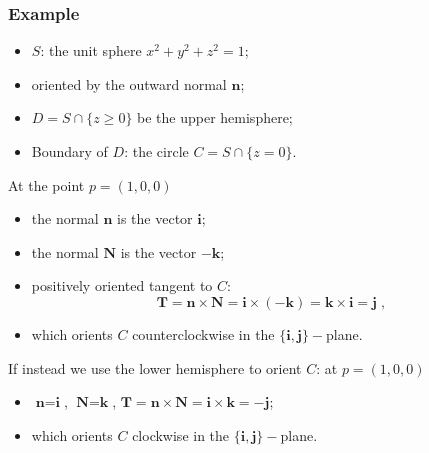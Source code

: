 \begin{frame}
  \frametitle{Example}

\begin{itemize}
  \item $S$: the unit sphere $x^2+y^2+z^2 = 1$;
  \item oriented by the outward normal $\textbf{n}$;
  \item $D = S \cap \{z\geqslant 0\}$ be the upper hemisphere;
  \item Boundary of $D$: the circle $C= S \cap \{z=0\}$.
\end{itemize}

\pause At the point $p=(1,0,0)$
\begin{itemize}
  \item the normal $\textbf{n}$ is the vector \pause $\textbf{i}$;
  \item the normal $\textbf{N}$ is the vector \pause $-\textbf{k}$;
  \item positively oriented tangent to $C$:\pause
%
$$\textbf{T}= \textbf{n} \times \textbf{N} = \textbf{i} \times (-\textbf{k}) = \textbf{k}\times \textbf{i} = \textbf{j} \;,$$
%
\item \pause which orients $C$ counterclockwise in the $\{\textbf{i},\textbf{j}\}-$plane.
\end{itemize}

\pause If instead we use the lower hemisphere to orient $C$: at $p=(1,0,0)$
 \begin{itemize}
   \item $\textbf{n}=\textbf{i}$, $\textbf{N}=\textbf{k}$, $\textbf{T}=\textbf{n}\times \textbf{N} = \textbf{i} \times \textbf{k} = -\textbf{j}$;
   \item which orients $C$ clockwise in the $\{\textbf{i},\textbf{j}\}-$plane.
 \end{itemize}
\end{frame}

